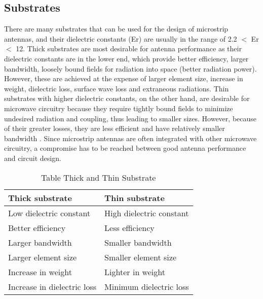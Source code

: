 \documentclass[12pt]{article}
\begin{document}
				\subsection{Substrates }\label{sub:Substrates Characteristics}
		           \justify
		            There are many substrates that can be used for the design of microstrip antennas, and their dielectric constants (Er) are usually in the range of 2.2 $<$ Er $<$ 12. Thick substrates are most desirable for antenna performance as their dielectric constants are in the lower end, which provide better efficiency, larger bandwidth, loosely bound fields for radiation into space (better radiation power). However, these are achieved at the expense of larger element size, increase in weight, dielectric loss, surface wave loss and extraneous radiations. Thin substrates with higher dielectric constants, on the other hand, are desirable for microwave circuitry because they require tightly bound fields to minimize undesired radiation and coupling, thus leading to smaller sizes. However, because of their greater losses, they are less efficient and have relatively smaller bandwidth . Since microstrip antennas are often integrated with other microwave circuitry, a compromise has to be reached between good antenna performance and circuit design.

		            \begin{center}
		            	\begin{table}[H]
		            		\centering
		            		\begin{tabular}{ |l|l|}
		            			\hline
		            			Thick substrate &	Thin substrate \\ \hline
		            			Low dielectric constant & High dielectric constant  \\ \hline
		            			Better efficiency &	Less efficiency  \\ \hline
		            			Larger bandwidth &	Smaller bandwidth  \\ \hline
		            			Larger element size & Smaller element size  \\ \hline
		            			Increase in weight &	Lighter in weight  \\ \hline
		            			Increase in dielectric loss &	Minimum dielectric loss  \\ \hline


		            		\end{tabular}
		            				            	\caption{Table Thick and Thin  Substrate }
		            	\end{table}

		            \end{center}
\end{document}
